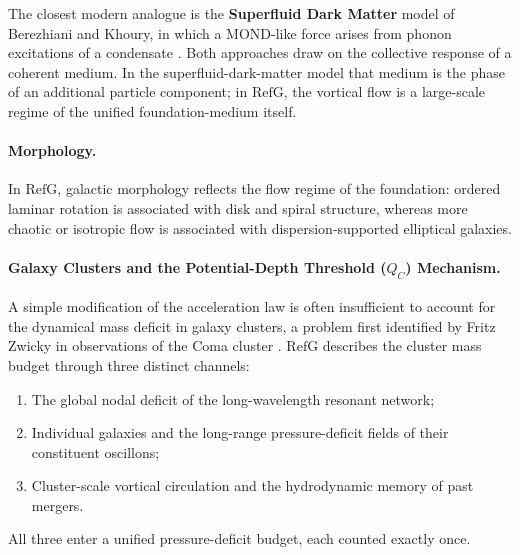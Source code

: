 \documentclass[11pt,a4paper]{article}
\newcommand{\RefG}{\mathrm{RefG}}
\begin{document}
The closest modern analogue is the \textbf{Superfluid Dark Matter} model of Berezhiani and Khoury, in which a MOND-like force arises from phonon excitations of a condensate \citep{berezhiani2015}. Both approaches draw on the collective response of a coherent medium. In the superfluid-dark-matter model that medium is the phase of an additional particle component; in $\RefG$, the vortical flow is a large-scale regime of the unified foundation-medium itself.

\paragraph{Morphology.} In $\RefG$, galactic morphology reflects the flow regime of the foundation: ordered laminar rotation is associated with disk and spiral structure, whereas more chaotic or isotropic flow is associated with dispersion-supported elliptical galaxies.

\paragraph{Galaxy Clusters and the Potential-Depth Threshold ($Q_C$) Mechanism.} A simple modification of the acceleration law is often insufficient to account for the dynamical mass deficit in galaxy clusters, a problem first identified by Fritz Zwicky in observations of the Coma cluster \citep{zwicky1933}. $\RefG$ describes the cluster mass budget through three distinct channels:
\begin{enumerate}[label=\arabic*.]
\item The global nodal deficit of the long-wavelength resonant network;
\item Individual galaxies and the long-range pressure-deficit fields of their constituent oscillons;
\item Cluster-scale vortical circulation and the hydrodynamic memory of past mergers.
\end{enumerate}
All three enter a unified pressure-deficit budget, each counted exactly once.
\end{document}
